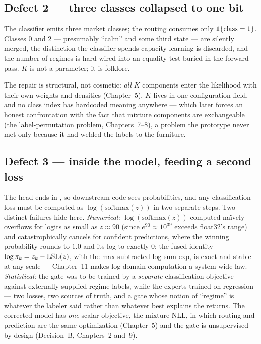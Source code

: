 \subsection*{Defect 2 --- three classes collapsed to one bit}

The classifier emits three market classes; the routing consumes only
$\mathbf{1}\{\text{class} = 1\}$. Classes $0$ and $2$ --- presumably ``calm'' and
some third state --- are silently merged, the distinction the classifier
spends capacity learning is discarded, and the number of regimes is
hard-wired into an equality test buried in the forward pass. $K$ is not a
parameter; it is folklore.

The repair is structural, not cosmetic: \emph{all} $K$ components enter the
likelihood with their own weights and densities (Chapter~5), $K$ lives in
one configuration field, and no class index has hardcoded meaning anywhere
--- which later forces an honest confrontation with the fact that mixture
components are exchangeable (the label-permutation problem, Chapters~7--8),
a problem the prototype never met only because it had welded the labels to
the furniture.

\subsection*{Defect 3 ---  inside the model, feeding a
second loss}

The head ends in , so downstream code sees probabilities,
and any classification loss must be computed as
$\log(\mathrm{softmax}(z))$ in two separate steps. Two distinct failures
hide here. \emph{Numerical:} $\log(\mathrm{softmax}(z))$ computed
na\"ively overflows for logits as small as $z \approx 90$ (since
$e^{90} \approx 10^{39}$ exceeds float32's range) and catastrophically
cancels for confident predictions, where the winning probability rounds to
$1.0$ and its log to exactly $0$; the fused  identity
$\log \pi_k = z_k - \operatorname{LSE}(z)$, with the max-subtracted log-sum-exp, is exact
and stable at any scale --- Chapter~11 makes log-domain computation a
system-wide law. \emph{Statistical:} the gate was to be trained by a
\emph{separate} classification objective against externally supplied
regime labels, while the experts trained on regression --- two losses, two
sources of truth, and a gate whose notion of ``regime'' is whatever the
labeler said rather than whatever best explains the returns. The corrected
model has \emph{one} scalar objective, the mixture NLL, in which routing and
prediction are the same optimization (Chapter~5) and the gate is
unsupervised by design (Decision~B, Chapters~2 and~9).

